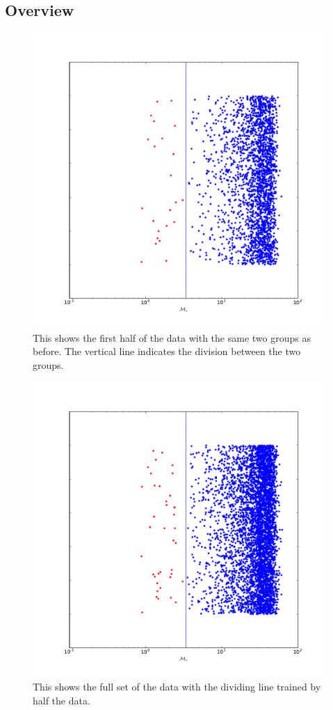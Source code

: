 \subsection{Overview}

\begin{figure}
\includegraphics[width=\columnwidth]{output/jake/classifier_half.pdf}
\caption{This shows the first half of the data with the same two groups as before. The vertical line indicates the division between the two groups.}
\label{fig:half}
\end{figure}
\begin{figure}
\includegraphics[width=\columnwidth]{output/jake/classifier_all.pdf}
\caption{This shows the full set of the data with the dividing line trained by half the data.}
\label{fig:all}
\end{figure}

